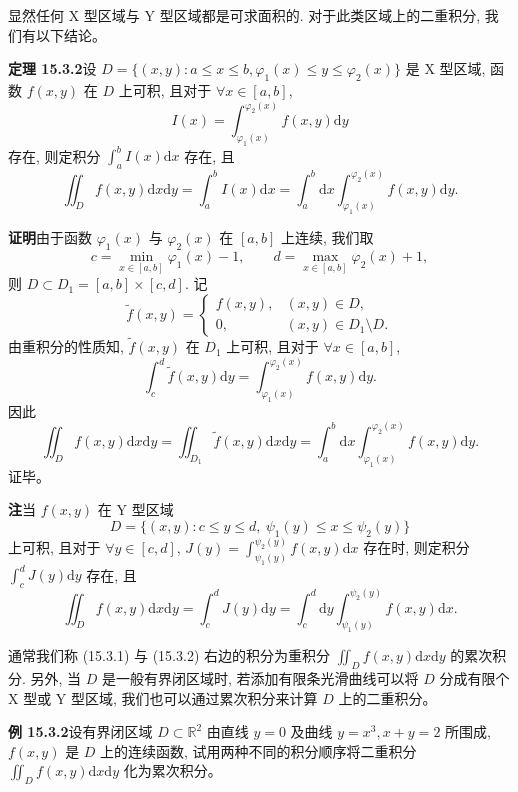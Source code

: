 \documentclass[UTF8, 12pt, fontset=fandol, oneside]{ctexart}
\begin{document}
显然任何 X 型区域与 Y 型区域都是可求面积的. 对于此类区域上的二重积分, 我们有以下结论。

\noindent\textbf{定理 15.3.2}\quad 设 $D=\{(x,y):a\leqslant x\leqslant b,\varphi_1(x)\leqslant y\leqslant\varphi_2(x)\}$ 是 X 型区域, 函数 $f(x,y)$ 在 $D$ 上可积, 且对于 $\forall x\in[a,b]$,
\[
  I(x)=\int_{\varphi_1(x)}^{\varphi_2(x)}f(x,y)\mathrm dy
\]
存在, 则定积分 $\int_a^b I(x)\mathrm dx$ 存在, 且
\begin{equation}
  \iint_D f(x,y)\mathrm dx\mathrm dy
  =\int_a^b I(x)\mathrm dx
  =\int_a^b\mathrm dx\int_{\varphi_1(x)}^{\varphi_2(x)}f(x,y)\mathrm dy.
  \tag{15.3.1}
\end{equation}

\noindent\textbf{证明}\quad 由于函数 $\varphi_1(x)$ 与 $\varphi_2(x)$ 在 $[a,b]$ 上连续, 我们取
\[
  c=\min_{x\in[a,b]}\varphi_1(x)-1,\qquad
  d=\max_{x\in[a,b]}\varphi_2(x)+1,
\]
则 $D\subset D_1=[a,b]\times[c,d]$. 记
\[
  \tilde f(x,y)=
  \begin{cases}
    f(x,y), & (x,y)\in D,\\
    0, & (x,y)\in D_1\setminus D.
  \end{cases}
\]
由重积分的性质知, $\tilde f(x,y)$ 在 $D_1$ 上可积, 且对于 $\forall x\in[a,b]$,
\[
  \int_c^d\tilde f(x,y)\mathrm dy
  =\int_{\varphi_1(x)}^{\varphi_2(x)}f(x,y)\mathrm dy.
\]
因此
\[
  \iint_D f(x,y)\mathrm dx\mathrm dy
  =\iint_{D_1}\tilde f(x,y)\mathrm dx\mathrm dy
  =\int_a^b\mathrm dx\int_{\varphi_1(x)}^{\varphi_2(x)}f(x,y)\mathrm dy.
\]
证毕。

\noindent\textbf{注}\quad 当 $f(x,y)$ 在 Y 型区域
\[
  D=\{(x,y):c\leqslant y\leqslant d,\ \psi_1(y)\leqslant x\leqslant\psi_2(y)\}
\]
上可积, 且对于 $\forall y\in[c,d]$, $J(y)=\int_{\psi_1(y)}^{\psi_2(y)}f(x,y)\mathrm dx$ 存在时, 则定积分 $\int_c^dJ(y)\mathrm dy$ 存在, 且
\begin{equation}
  \iint_D f(x,y)\mathrm dx\mathrm dy
  =\int_c^dJ(y)\mathrm dy
  =\int_c^d\mathrm dy\int_{\psi_1(y)}^{\psi_2(y)}f(x,y)\mathrm dx.
  \tag{15.3.2}
\end{equation}

通常我们称 (15.3.1) 与 (15.3.2) 右边的积分为重积分 $\iint_D f(x,y)\mathrm dx\mathrm dy$ 的累次积分. 另外, 当 $D$ 是一般有界闭区域时, 若添加有限条光滑曲线可以将 $D$ 分成有限个 X 型或 Y 型区域, 我们也可以通过累次积分来计算 $D$ 上的二重积分。

\noindent\textbf{例 15.3.2}\quad 设有界闭区域 $D\subset\mathbb R^2$ 由直线 $y=0$ 及曲线 $y=x^3,x+y=2$ 所围成, $f(x,y)$ 是 $D$ 上的连续函数, 试用两种不同的积分顺序将二重积分 $\iint_D f(x,y)\mathrm dx\mathrm dy$ 化为累次积分。
\end{document}
